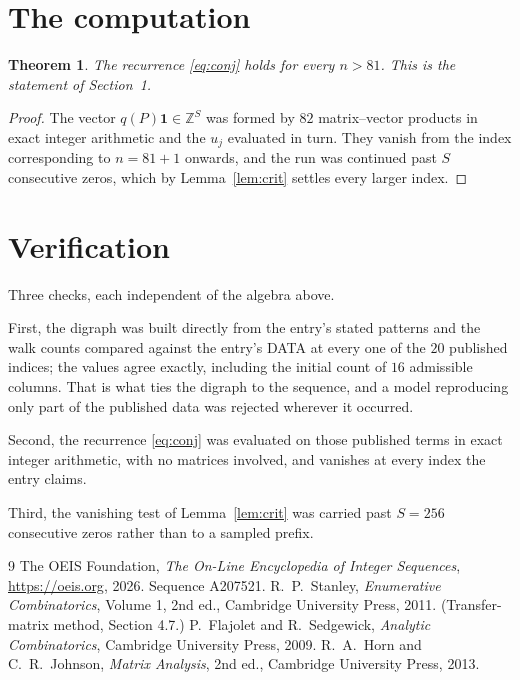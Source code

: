 \documentclass[11pt,a4paper]{article}
\theoremstyle{plain}
\newtheorem{theorem}{Theorem}
\theoremstyle{definition}
\begin{document}
\section{The computation}

\begin{theorem}
The recurrence \eqref{eq:conj} holds for every $n>81$. This is the statement of
Section~1.
\end{theorem}

\begin{proof}
The vector $q(P)\mathbf{1}\in\mathbb{Z}^{S}$ was formed by $82$ matrix--vector
products in exact integer arithmetic and the $u_j$ evaluated in turn. They vanish from the
index corresponding to $n=81+1$ onwards, and the run was continued past $S$ consecutive
zeros, which by Lemma~\ref{lem:crit} settles every larger index.
\end{proof}

\section{Verification}

Three checks, each independent of the algebra above.

First, the digraph was built directly from the entry's stated patterns and the walk counts
compared against the entry's DATA at every one of the $20$ published indices; the
values agree exactly, including the initial count of $16$ admissible columns. That is
what ties the digraph to the sequence, and a model reproducing only part of the published
data was rejected wherever it occurred.

Second, the recurrence \eqref{eq:conj} was evaluated on those published terms in exact
integer arithmetic, with no matrices involved, and vanishes at every index the entry claims.

Third, the vanishing test of Lemma~\ref{lem:crit} was carried past $S=256$ consecutive
zeros rather than to a sampled prefix.

\begin{thebibliography}{9}
 The OEIS Foundation, \emph{The On-Line Encyclopedia of Integer
Sequences}, \url{https://oeis.org}, 2026. Sequence A207521.
 R.~P.~Stanley, \emph{Enumerative Combinatorics}, Volume 1, 2nd ed.,
Cambridge University Press, 2011. (Transfer-matrix method, Section 4.7.)
 P.~Flajolet and R.~Sedgewick, \emph{Analytic Combinatorics}, Cambridge
University Press, 2009.
 R.~A.~Horn and C.~R.~Johnson, \emph{Matrix Analysis}, 2nd ed., Cambridge
University Press, 2013.
\end{thebibliography}
\end{document}
